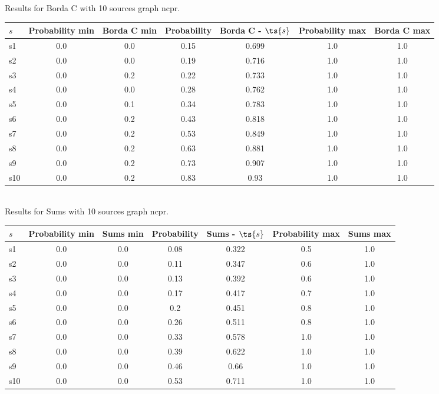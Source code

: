 \documentclass{article}
\begin{document}
\noindent Results for Borda C with 10 sources graph ncpr.

\noindent\begin{tabular}{|l|c|c|c|c|c|c|}
\hline
$s$& Probability min & Borda C min & Probability & Borda C - $\ts{s}$ & Probability max & Borda C max\\
\hline
s1 &0.0 & 0.0 & 0.15 & 0.699 & 1.0 & 1.0\\
\hline
s2 &0.0 & 0.0 & 0.19 & 0.716 & 1.0 & 1.0\\
\hline
s3 &0.0 & 0.2 & 0.22 & 0.733 & 1.0 & 1.0\\
\hline
s4 &0.0 & 0.0 & 0.28 & 0.762 & 1.0 & 1.0\\
\hline
s5 &0.0 & 0.1 & 0.34 & 0.783 & 1.0 & 1.0\\
\hline
s6 &0.0 & 0.2 & 0.43 & 0.818 & 1.0 & 1.0\\
\hline
s7 &0.0 & 0.2 & 0.53 & 0.849 & 1.0 & 1.0\\
\hline
s8 &0.0 & 0.2 & 0.63 & 0.881 & 1.0 & 1.0\\
\hline
s9 &0.0 & 0.2 & 0.73 & 0.907 & 1.0 & 1.0\\
\hline
s10 &0.0 & 0.2 & 0.83 & 0.93 & 1.0 & 1.0\\
\hline
\end{tabular}\\

\noindent Results for Sums with 10 sources graph ncpr.

\noindent\begin{tabular}{|l|c|c|c|c|c|c|}
\hline
$s$& Probability min & Sums min & Probability & Sums - $\ts{s}$ & Probability max & Sums max\\
\hline
s1 &0.0 & 0.0 & 0.08 & 0.322 & 0.5 & 1.0\\
\hline
s2 &0.0 & 0.0 & 0.11 & 0.347 & 0.6 & 1.0\\
\hline
s3 &0.0 & 0.0 & 0.13 & 0.392 & 0.6 & 1.0\\
\hline
s4 &0.0 & 0.0 & 0.17 & 0.417 & 0.7 & 1.0\\
\hline
s5 &0.0 & 0.0 & 0.2 & 0.451 & 0.8 & 1.0\\
\hline
s6 &0.0 & 0.0 & 0.26 & 0.511 & 0.8 & 1.0\\
\hline
s7 &0.0 & 0.0 & 0.33 & 0.578 & 1.0 & 1.0\\
\hline
s8 &0.0 & 0.0 & 0.39 & 0.622 & 1.0 & 1.0\\
\hline
s9 &0.0 & 0.0 & 0.46 & 0.66 & 1.0 & 1.0\\
\hline
s10 &0.0 & 0.0 & 0.53 & 0.711 & 1.0 & 1.0\\
\hline
\end{tabular}\\
\end{document}
